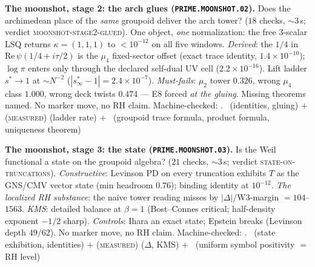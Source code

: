 \par\smallskip\noindent\textbf{The moonshot, stage 2: the arch glues
(\texttt{PRIME.MOONSHOT.02}).}
Does the archimedean place of the \emph{same} groupoid deliver the
arch tower? ($18$ checks, ${\sim}3$\,s; verdict
\textsc{moonshot-stage2-glued}).  One object, \emph{one}
normalization: the free 3-scalar LSQ returns $\kappa=(1,1,1)$ to
$<10^{-12}$ on all five windows.  \emph{Derived}: the $1/4$ in
$\mathrm{Re}\,\psi(1/4+i\tau/2)$ is the $\mu_4$ fixed-sector offset
(exact trace identity, $1.4\times10^{-10}$); $\log\pi$ enters only
through the declared self-dual UV cell ($2.2\times10^{-16}$).  Lift
ladder $s^*\to1$ at ${\sim}N^{-2}$ ($|s^*_\infty-1|=2.4\times
10^{-7}$).  \emph{Must-fails}: $\mu_2$ tower $0.326$, wrong $\mu_4$
class $1.000$, wrong deck twists $0.474$ --- E8 forced \emph{at the
gluing}.  Missing theorems named.  No marker move, no RH claim.
Machine-checked: .
\mE\ (identities, gluing) $+$ (\textsc{measured}) (ladder rate) $+$
\mO\ (groupoid trace formula, product formula, uniqueness theorem)
\par\smallskip


\par\smallskip\noindent\textbf{The moonshot, stage 3: the state
(\texttt{PRIME.MOONSHOT.03}).}
Is the Weil functional a state on the groupoid algebra? ($21$
checks, ${\sim}3$\,s; verdict \textsc{state-on-truncations}).
\emph{Constructive}: Levinson PD on every truncation exhibits $T$ as
the GNS/CMV vector state (min headroom $0.76$); binding identity at
$10^{-12}$.  \emph{The localized RH substance}: the naive tower
reading misses by $|\Delta|/\mathrm{W3}$-margin $=104$--$1563$.
\emph{KMS}: detailed balance at $\beta=1$ (Bost--Connes critical;
half-density exponent $-1/2$ sharp).  \emph{Controls}: Ihara an
exact state; Epstein breaks (Levinson depth $49/62$).  No marker
move, no RH claim.
Machine-checked: .
\mE\ (state exhibition, identities) $+$ (\textsc{measured})
($\Delta$, KMS) $+$ \mO\ (uniform symbol positivity $=$ RH level)
\par\smallskip


